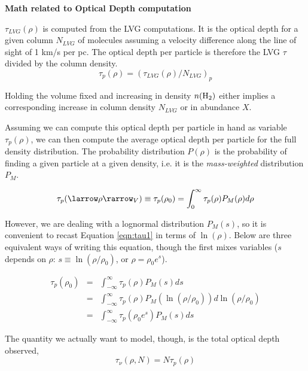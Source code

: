 


\textbf{Math related to Optical Depth computation}

$\tau_{LVG}(\rho)$ is computed from the LVG computations.  It is the optical
depth for a given column $N_{LVG}$ of \formaldehyde molecules assuming a velocity
difference along the line of sight of 1 km/s per pc.
The optical depth per particle is therefore the LVG $\tau$ divided by the column
density.
\begin{equation}
    \tau_p(\rho) = (\tau_{LVG}(\rho)/N_{LVG})_p
\end{equation}

Holding the volume fixed and increasing in density $n(\textrm{H}_{2})$ either implies a
corresponding increase in column density $N_{LVG}$ or in abundance $X$.

Assuming we can compute this optical depth per particle in hand as variable
$\tau_p(\rho)$, we can then compute the average optical depth per particle for
the full density distribution.
The probability distribution $P(\rho)$ is the probability of finding a given
particle at a given density, i.e. it is the \emph{mass-weighted} distribution $P_M$.

\begin{equation}
    \label{eqn:tau1}
    \tau_p(\larrow\rho\rarrow_V) \equiv \tau_p(\rho_0) = \int_0^\infty \tau_p(\rho) P_M(\rho) d\rho
\end{equation}

However, we are dealing with a lognormal distribution $P_M(s)$, so it is
convenient to recast Equation \ref{eqn:tau1} in terms of $\ln(\rho)$.
Below are three equivalent ways of writing this equation, though the first
mixes variables ($s$ depends on $\rho$: $s\equiv \ln(\rho/\rho_0)$, or $\rho = \rho_0 e^s$).

\begin{eqnarray}
    \label{eqn:tau2}
    \tau_p(\rho_0) & = & \int_{-\infty}^\infty \tau_p(\rho) P_M(s) d s \\
                 & = & \int_{-\infty}^\infty \tau_p(\rho) P_M(\ln (\rho/\rho_0)) d\ln (\rho/\rho_0) \\
                 & = & \int_{-\infty}^\infty \tau_p(\rho_0 e^s) P_M(s) d s 
\end{eqnarray}

The quantity we actually want to model, though, is the total optical depth observed,
\begin{equation}
    \label{eqn:totaltau1}
    \tau_\nu(\rho,N) = N \tau_p(\rho)
\end{equation}

